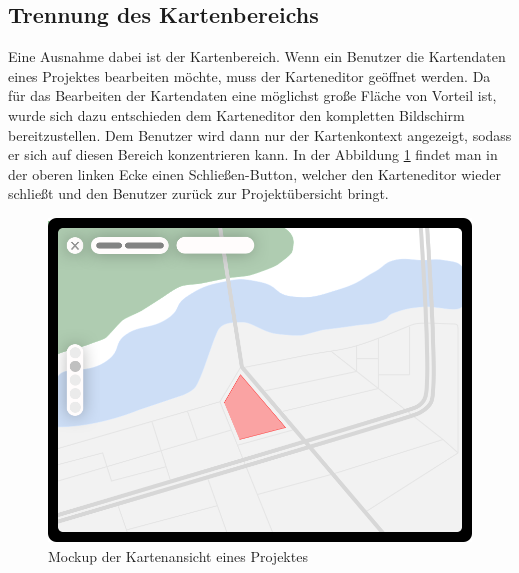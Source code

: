 \subsection{Trennung des Kartenbereichs}
Eine Ausnahme dabei ist der Kartenbereich.
Wenn ein Benutzer die Kartendaten eines Projektes bearbeiten möchte, muss der Karteneditor geöffnet werden.
Da für das Bearbeiten der Kartendaten eine möglichst große Fläche von Vorteil ist, wurde sich dazu entschieden dem Karteneditor den kompletten Bildschirm bereitzustellen.
Dem Benutzer wird dann nur der Kartenkontext angezeigt, sodass er sich auf diesen Bereich konzentrieren kann.
In der Abbildung \ref{fig:design-map} findet man in der oberen linken Ecke einen Schließen-Button, welcher den Karteneditor wieder schließt und den Benutzer zurück zur Projektübersicht bringt.
\begin{figure}[h!]
	\centering
	\vspace{15pt}
	\includegraphics[scale=0.4]{images/design-map}
	\caption{Mockup der Kartenansicht eines Projektes}
	\label{fig:design-map}
\end{figure}


